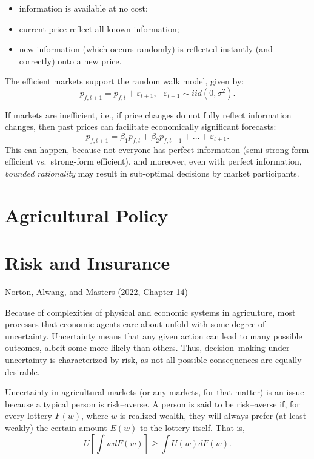 \documentclass[
  oneside]{book}
\providecommand{\tightlist}{%
  \setlength{\itemsep}{0pt}\setlength{\parskip}{0pt}}
\begin{document}
\begin{itemize}
\tightlist
\item
  information is available at no cost;
\item
  current price reflect all known information;
\item
  new information (which occurs randomly) is reflected instantly (and correctly) onto a new price.
\end{itemize}

The efficient markets support the random walk model, given by: \[p_{f,t+1} = p_{f,t} + \varepsilon_{t+1},\;~~\varepsilon_{t+1}\sim iid\left(0,\sigma^2\right).\]

If markets are inefficient, i.e., if price changes do not fully reflect information changes, then past prices can facilitate economically significant forecasts: \[p_{f,t+1} = \beta_1 p_{f,t} + \beta_2 p_{f,t-1} + \ldots + \varepsilon_{t+1}.\] This can happen, because not everyone has perfect information (semi-strong-form efficient vs.~strong-form efficient), and moreover, even with perfect information, \emph{bounded rationality} may result in sub-optimal decisions by market participants.

\hypertarget{agricultural-policy}{%
\chapter*{Agricultural Policy}\label{agricultural-policy}}

\hypertarget{risk-and-insurance}{%
\chapter{Risk and Insurance}\label{risk-and-insurance}}

\protect\hyperlink{ref-norton2022}{Norton, Alwang, and Masters} (\protect\hyperlink{ref-norton2022}{2022}, Chapter 14)

Because of complexities of physical and economic systems in agriculture, most processes that economic agents care about unfold with some degree of uncertainty. Uncertainty means that any given action can lead to many possible outcomes, albeit some more likely than others. Thus, decision--making under uncertainty is characterized by risk, as not all possible consequences are equally desirable.

Uncertainty in agricultural markets (or any markets, for that matter) is an issue because a typical person is risk--averse. A person is said to be risk--averse if, for every lottery \(F(w)\), where \(w\) is realized wealth, they will always prefer (at least weakly) the certain amount \(E(w)\) to the lottery itself. That is, \[U\left[\int w dF(w)\right] \ge \int U(w)dF(w).\]
\end{document}

